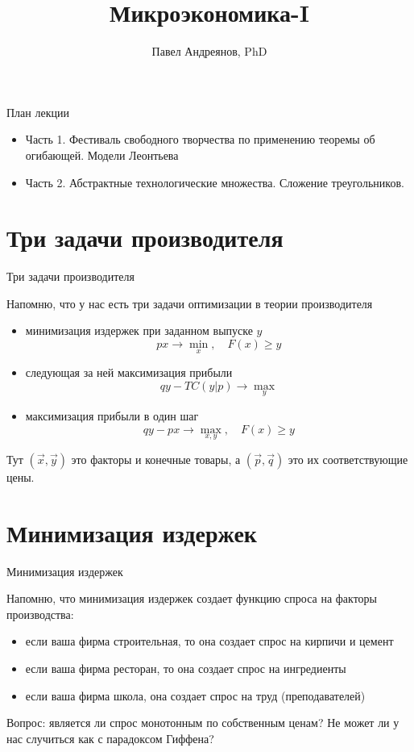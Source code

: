 \documentclass{beamer}
\title{
Микроэкономика-I
}
\author{
Павел Андреянов, PhD
}
\begin{document}
\maketitle

\begin{frame}{План лекции}

\begin{itemize}
  \item Часть 1. Фестиваль свободного творчества по применению теоремы об огибающей. Модели Леонтьева
  \item Часть 2. Абстрактные технологические множества. Сложение треугольников.
\end{itemize}


\end{frame}

\section{Три задачи производителя}

\begin{frame}{Три задачи производителя}

Напомню, что у нас есть три задачи оптимизации в теории производителя

\begin{itemize}
  \item минимизация издержек при заданном выпуске $y$
  $$ p x \to \min_x, \quad F(x) \geqslant y $$
  \item следующая за ней максимизация прибыли
  $$ q y - TC(y|p) \to \max_y$$
  \item максимизация прибыли в один шаг
  $$ q y - p x \to \max_{x,y}, \quad F(x) \geqslant y$$
\end{itemize}

Тут $(\vec x, \vec y)$ это факторы и конечные товары, а $(\vec p, \vec q)$ это их соответствующие цены.

\end{frame}

\section{Минимизация издержек}

\begin{frame}{Минимизация издержек}

Напомню, что минимизация издержек создает функцию спроса на факторы производства:

\begin{itemize}
  \item если ваша фирма строительная, то она создает спрос на кирпичи и цемент
  \item если ваша фирма ресторан, то она создает спрос на ингредиенты
  \item если ваша фирма школа, она создает спрос на труд (преподавателей)
\end{itemize}

Вопрос: является ли спрос монотонным по собственным ценам? Не может ли у нас случиться как с парадоксом Гиффена?

\end{frame}
\end{document}
